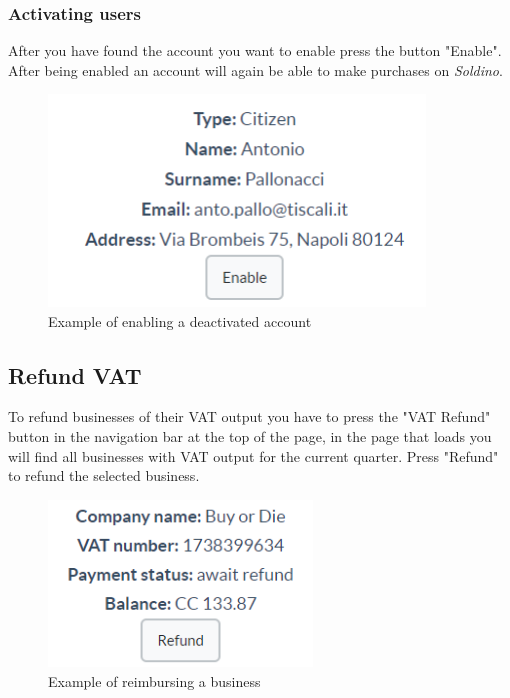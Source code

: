 		\subsubsection{Activating users}
		After you have found the account you want to enable press the button 
		"Enable". After being enabled an account will again be able to make 
		purchases on \textit{Soldino}.
		\begin{figure}[H]
			\includegraphics[width=10cm]{res/images/user_enable.png}
			\centering
			\caption{Example of enabling a deactivated account}
		\end{figure}
	\subsection{Refund VAT}
	To refund businesses of their VAT output you have to press the "VAT 
	Refund" button in the navigation bar at the top of the page, in the 
	page that loads you will find all businesses with VAT output for the current quarter.
	Press "Refund" to refund the selected business.
	\begin{figure}[H]
		\includegraphics[width=7cm]{res/images/business_refund.png}
		\centering
		\caption{Example of reimbursing a business}
	\end{figure}